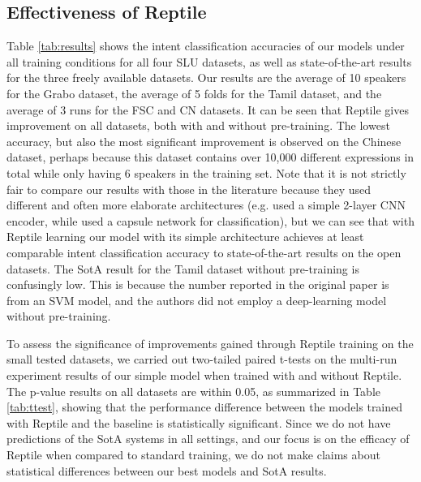 \documentclass[a4paper]{article}
\begin{document}
	\subsection{Effectiveness of Reptile}
	Table \ref{tab:results} shows the intent classification accuracies of our models under all training conditions for all four SLU datasets, as well as state-of-the-art results for the three freely available datasets. Our results are the average of 10  speakers for the Grabo dataset, the average of 5 folds for the Tamil dataset, and the average of 3 runs for the FSC and CN datasets. It can be seen that Reptile gives improvement on all datasets, both with and without pre-training. The lowest accuracy, but also the most significant improvement is observed on the Chinese dataset, perhaps because this dataset contains over 10,000 different expressions in total while only having 6 speakers in the training set. Note that it is not strictly fair to compare our results with those in the literature because they used different and often more elaborate architectures (e.g. \cite{karunanayakesinhala} used a simple 2-layer CNN encoder, while \cite{CapsuleSLU} used a capsule network for classification), but we can see that with Reptile learning our model with its simple architecture achieves at least comparable intent classification accuracy to state-of-the-art results on the open datasets. The SotA result for the Tamil dataset without pre-training is confusingly low. This is because the number reported in the original paper is from an SVM model, and the authors did not employ a deep-learning model without pre-training.
	
	To assess the significance of improvements gained through Reptile training on the small tested datasets, we carried out two-tailed paired t-tests on the multi-run experiment results of our simple model when trained with and without Reptile. The p-value results on all datasets are within 0.05, as summarized in Table \ref{tab:ttest}, showing that the performance difference between the models trained with Reptile and the baseline is statistically significant. Since we do not have predictions of the SotA systems in all settings, and our focus is on the efficacy of Reptile when compared to standard training, we do not make claims about statistical differences between our best models and SotA results.
	
\end{document}
